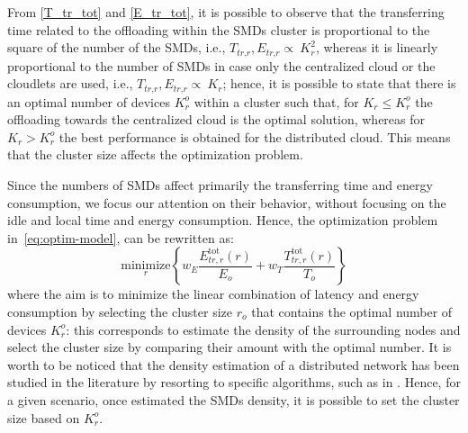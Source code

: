 \documentclass[twoside,openright]{report}
\begin{document}
From \eqref{T_tr_tot} and \eqref{E_tr_tot}, it is possible to observe that the transferring time related to the offloading within the \glspl{SMD} cluster is proportional to the square of the number of the \glspl{SMD}, i.e., $T_\textit{tr,r},E_\textit{tr,r} \propto~K_r^2$, whereas it is linearly proportional to the number of  \glspl{SMD} in case only the centralized cloud or the cloudlets are used, i.e.,  $T_\textit{tr,r},E_\textit{tr,r} \propto~K_r$; hence,  it is possible to state that there is an optimal number of devices ${K}^o_{r}$ within a cluster such that, for $K_r\le{K}^o_{r}$ the offloading towards the centralized cloud is the optimal solution, whereas for $K_{r}>{K}^o_{r}$ the best performance is obtained for the distributed cloud. This means that the cluster size affects the optimization problem. 

Since the numbers of  \glspl{SMD} affect primarily the transferring time and energy consumption, we focus our attention on their behavior, without focusing on the idle and local time and energy consumption. Hence, the optimization problem in~\eqref{eq:optim-model}, can be rewritten as:
%
\begin{equation}
\label{eq:optim-modelKr}
\underset{r}{\text{minimize}} \left\{w_E \frac{E^{\text{tot}}_{\textit{tr},r}(r)}{E_o} + w_T  \frac{T^{\text{tot}}_{\textit{tr},r}(r)}{T_o}\right\} \end{equation}
%
where the aim is to minimize the linear combination of latency and energy consumption by selecting the cluster size $r_o$ that contains the optimal number of devices ${K}^o_{r}$: this corresponds to estimate the density of the surrounding nodes and select the cluster size by comparing their amount with the optimal number. It is worth to be noticed that the density estimation of a distributed network has been studied in the literature by resorting to specific algorithms, such as in \cite{SMDdensity}. Hence, for a given scenario, once estimated the \glspl{SMD} density, it is possible to set the cluster size based on ${K}^o_{r}$.%
\end{document}
